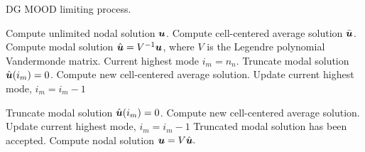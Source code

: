 \documentclass[11pt]{article}
\begin{document}
\begin{algorithm}
    \caption{DG MOOD limiting process.}
    \label{alg:mood}
    \begin{algorithmic}[1]
        \STATE Compute unlimited nodal solution $\boldsymbol{u}$.
        \STATE Compute cell-centered average solution $\bar{\boldsymbol{u}}$.
        \STATE Compute modal solution $\hat{\boldsymbol{u}} = V^{-1} \boldsymbol{u}$, where $V$ is the Legendre polynomial Vandermonde matrix.
        \STATE Current highest mode $i_m = n_n$.
                \STATE Truncate modal solution $\hat{\boldsymbol{u}}(i_m) = 0$.
                \STATE Compute new cell-centered average solution.
                \STATE Update current highest mode, $i_m = i_m - 1$
            \ENDIF
            
                    \STATE Truncate modal solution $\hat{\boldsymbol{u}}(i_m) = 0$.
                    \STATE Compute new cell-centered average solution.
                    \STATE Update current highest mode, $i_m = i_m - 1$
                \ENDIF
            \ENDIF
        \ENDWHILE
        \STATE Truncated modal solution has been accepted.
        \STATE Compute nodal solution $\boldsymbol{u} = V\hat{\boldsymbol{u}}.$
    \end{algorithmic}
\end{algorithm}






\end{document}
